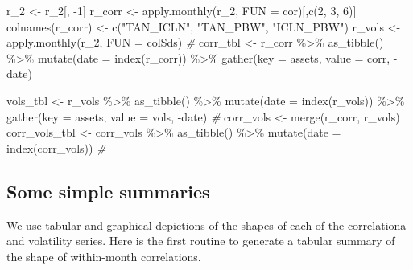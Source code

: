 \documentclass{article}
\newenvironment{Shaded}{\begin{snugshade}}{\end{snugshade}}
\newcommand{\AttributeTok}[1]{\textcolor[rgb]{0.77,0.63,0.00}{#1}}
\newcommand{\CommentTok}[1]{\textcolor[rgb]{0.56,0.35,0.01}{\textit{#1}}}
\newcommand{\DecValTok}[1]{\textcolor[rgb]{0.00,0.00,0.81}{#1}}
\newcommand{\FunctionTok}[1]{\textcolor[rgb]{0.00,0.00,0.00}{#1}}
\newcommand{\NormalTok}[1]{#1}
\newcommand{\OtherTok}[1]{\textcolor[rgb]{0.56,0.35,0.01}{#1}}
\newcommand{\SpecialCharTok}[1]{\textcolor[rgb]{0.00,0.00,0.00}{#1}}
\newcommand{\StringTok}[1]{\textcolor[rgb]{0.31,0.60,0.02}{#1}}
\begin{document}
\begin{Shaded}
\begin{Highlighting}[]
\NormalTok{r\_2 }\OtherTok{\textless{}{-}}\NormalTok{ r\_2[, }\SpecialCharTok{{-}}\DecValTok{1}\NormalTok{]}
\NormalTok{r\_corr }\OtherTok{\textless{}{-}} \FunctionTok{apply.monthly}\NormalTok{(r\_2, }\AttributeTok{FUN =}\NormalTok{ cor)[,}\FunctionTok{c}\NormalTok{(}\DecValTok{2}\NormalTok{, }\DecValTok{3}\NormalTok{, }\DecValTok{6}\NormalTok{)]}
\FunctionTok{colnames}\NormalTok{(r\_corr) }\OtherTok{\textless{}{-}} \FunctionTok{c}\NormalTok{(}\StringTok{"TAN\_ICLN"}\NormalTok{, }\StringTok{"TAN\_PBW"}\NormalTok{, }\StringTok{"ICLN\_PBW"}\NormalTok{)}
\NormalTok{r\_vols }\OtherTok{\textless{}{-}} \FunctionTok{apply.monthly}\NormalTok{(r\_2, }\AttributeTok{FUN =}\NormalTok{ colSds)}
\CommentTok{\# }
\NormalTok{corr\_tbl }\OtherTok{\textless{}{-}}\NormalTok{ r\_corr }\SpecialCharTok{\%\textgreater{}\%} 
  \FunctionTok{as\_tibble}\NormalTok{() }\SpecialCharTok{\%\textgreater{}\%} 
  \FunctionTok{mutate}\NormalTok{(}\AttributeTok{date =} \FunctionTok{index}\NormalTok{(r\_corr)) }\SpecialCharTok{\%\textgreater{}\%} 
  \FunctionTok{gather}\NormalTok{(}\AttributeTok{key =}\NormalTok{ assets, }\AttributeTok{value =}\NormalTok{ corr, }\SpecialCharTok{{-}}\NormalTok{date)}

\NormalTok{vols\_tbl }\OtherTok{\textless{}{-}}\NormalTok{ r\_vols }\SpecialCharTok{\%\textgreater{}\%} 
  \FunctionTok{as\_tibble}\NormalTok{() }\SpecialCharTok{\%\textgreater{}\%} 
  \FunctionTok{mutate}\NormalTok{(}\AttributeTok{date =} \FunctionTok{index}\NormalTok{(r\_vols)) }\SpecialCharTok{\%\textgreater{}\%} 
  \FunctionTok{gather}\NormalTok{(}\AttributeTok{key =}\NormalTok{ assets, }\AttributeTok{value =}\NormalTok{ vols, }\SpecialCharTok{{-}}\NormalTok{date) }
\CommentTok{\#}
\NormalTok{corr\_vols }\OtherTok{\textless{}{-}} \FunctionTok{merge}\NormalTok{(r\_corr, r\_vols)}
\NormalTok{corr\_vols\_tbl }\OtherTok{\textless{}{-}}\NormalTok{ corr\_vols }\SpecialCharTok{\%\textgreater{}\%} 
  \FunctionTok{as\_tibble}\NormalTok{() }\SpecialCharTok{\%\textgreater{}\%} 
  \FunctionTok{mutate}\NormalTok{(}\AttributeTok{date =} \FunctionTok{index}\NormalTok{(corr\_vols))}
\CommentTok{\#}
\end{Highlighting}
\end{Shaded}

\hypertarget{some-simple-summaries}{%
\subsection{Some simple summaries}\label{some-simple-summaries}}

We use tabular and graphical depictions of the shapes of each of the
correlationa and volatility series. Here is the first routine to
generate a tabular summary of the shape of within-month correlations.
\end{document}
